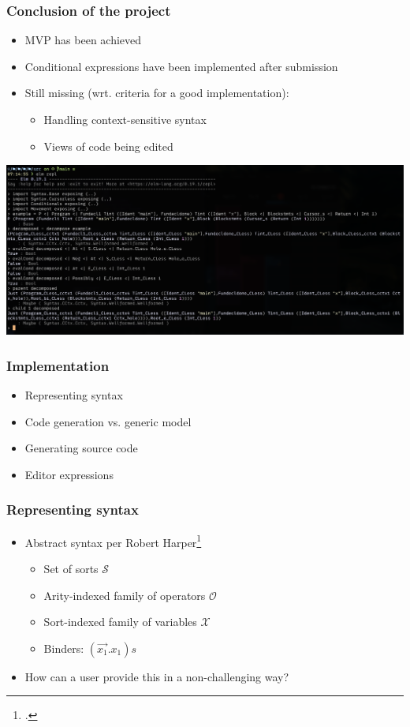 \documentclass[t,24pt,aspectratio=169]{beamer}
\begin{document}
\begin{frame}[hvid]
    \frametitle{Conclusion of the project}
    \begin{itemize}
        \item MVP has been achieved
        \item Conditional expressions have been implemented after submission
        \item Still missing (wrt. criteria for a good implementation):
              \begin{itemize}
                  \item Handling context-sensitive syntax
                  \item Views of code being edited
              \end{itemize}
    \end{itemize}
    \includegraphics[width=\textwidth]{img/repl-editor.png}
\end{frame}


\begin{frame}[hvid]
    \frametitle{Implementation}
    \begin{itemize}
        \item Representing syntax
        \item Code generation vs. generic model
        \item Generating source code
        \item Editor expressions
    \end{itemize}
\end{frame}

\begin{frame}[hvid]
    \frametitle{Representing syntax}
    \begin{itemize}
        \item Abstract syntax per Robert Harper\footcite{harper}
              \begin{itemize}
                  \item Set of sorts $\mathcal{S}$
                  \item Arity-indexed family of operators $\mathcal{O}$
                  \item Sort-indexed family of variables $\mathcal{X}$
                  \item Binders: $(\vec{x_1}.x_1)s$
              \end{itemize}
              \pause
        \item How can a user provide this in a non-challenging way?
    \end{itemize}
\end{frame}
\end{document}
